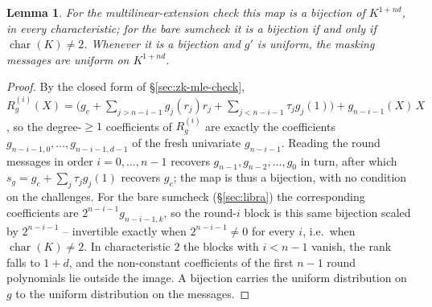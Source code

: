 \documentclass{article}
\newtheorem{lemma}[theorem]{Lemma}
\theoremstyle{definition}
\begin{document}
\begin{lemma}
\label{lem:masking-uniform}
For the multilinear-extension check this map is a bijection of $K^{1 + nd}$, in every characteristic; for the bare sumcheck it is a bijection if and only if $\operatorname{char}(K) \neq 2$. Whenever it is a bijection and $g'$ is uniform, the masking messages are uniform on $K^{1 + nd}$.
\end{lemma}

\begin{proof}
By the closed form of \S\ref{sec:zk-mle-check}, $R_g^{(i)}(X) = \bigl( g_c + \sum_{j > n - i - 1} g_j(r_j) r_j + \sum_{j < n - i - 1} \tau_j g_j(1) \bigr) + g_{n - i - 1}(X)\, X$, so the degree-$\ge 1$ coefficients of $R_g^{(i)}$ are exactly the coefficients $g_{n - i - 1, 0}, \ldots, g_{n - i - 1, d - 1}$ of the fresh univariate $g_{n - i - 1}$. Reading the round messages in order $i = 0, \ldots, n - 1$ recovers $g_{n - 1}, g_{n - 2}, \ldots, g_0$ in turn, after which $s_g = g_c + \sum_j \tau_j g_j(1)$ recovers $g_c$; the map is thus a bijection, with no condition on the challenges. For the bare sumcheck (\S\ref{sec:libra}) the corresponding coefficients are $2^{n - i - 1} g_{n - i - 1, k}$, so the round-$i$ block is this same bijection scaled by $2^{n - i - 1}$ -- invertible exactly when $2^{n - i - 1} \neq 0$ for every $i$, i.e.\ when $\operatorname{char}(K) \neq 2$. In characteristic $2$ the blocks with $i < n - 1$ vanish, the rank falls to $1 + d$, and the non-constant coefficients of the first $n - 1$ round polynomials lie outside the image. A bijection carries the uniform distribution on $g$ to the uniform distribution on the messages.
\end{proof}
\end{document}
